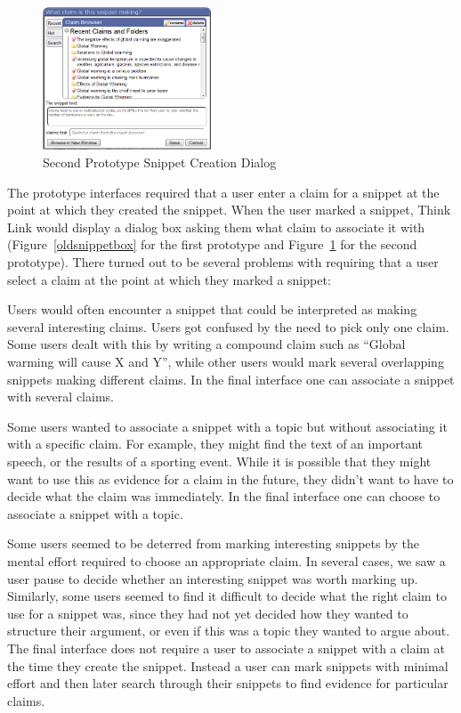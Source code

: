 \documentclass{chi2009}
\begin{document}
\begin{figure}[t]
\begin{center}
	\includegraphics[width=5cm]{../screenshots/newsnip_browseopen.png}
	\caption{Second Prototype Snippet Creation Dialog}
	\label{secondsnippetbox}
\end{center}
\end{figure}

The prototype interfaces required that a user enter a claim for a snippet at the point at which they created the snippet. When the user marked a snippet, Think Link would display a dialog box asking them what claim to associate it with (Figure~\ref{oldsnippetbox} for the first prototype and Figure~\ref{secondsnippetbox} for the second prototype). There turned out to be several problems with requiring that a user select a claim at the point at which they marked a snippet:

Users would often encounter a snippet that could be interpreted as making several interesting claims. Users got confused by the need to pick only one claim. Some users dealt with this by writing a compound claim such as ``Global warming will cause X and Y'', while other users would mark several overlapping snippets making different claims. In the final interface one can associate a snippet with several claims.

Some users wanted to associate a snippet with a topic but without associating it with a specific claim. For example, they might find the text of an important speech, or the results of a sporting event. While it is possible that they might want to use this as evidence for a claim in the future, they didn't want to have to decide what the claim was immediately. In the final interface one can choose to associate a snippet with a topic.

Some users seemed to be deterred from marking interesting snippets by the mental effort required to choose an appropriate claim. In several cases, we saw a user pause to decide whether an interesting snippet was worth marking up. Similarly, some users seemed to find it difficult to decide what the right claim to use for a snippet was, since they had not yet decided how they wanted to structure their argument, or even if this was a topic they wanted to argue about. The final interface does not require a user to associate a snippet with a claim at the time they create the snippet. Instead a user can mark snippets with minimal effort and then later search through their snippets to find evidence for particular claims.
\end{document}
